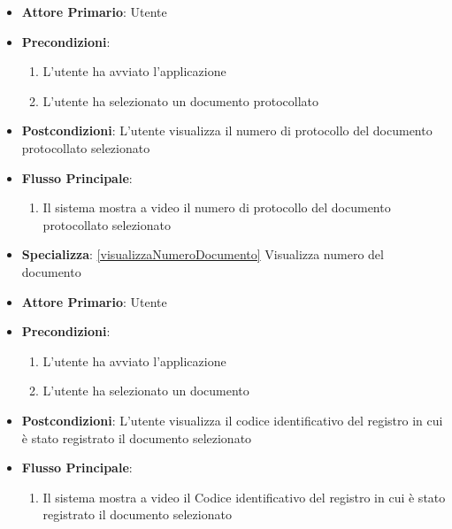 \begin{itemize}
\item \textbf{Attore Primario}: Utente
    \item \textbf{Precondizioni}:
    \begin{enumerate}
        \item L'utente ha avviato l'applicazione
        \item L'utente ha selezionato un documento protocollato
    \end{enumerate}
    \item \textbf{Postcondizioni}: L'utente visualizza il numero di protocollo del documento protocollato selezionato
    \item \textbf{Flusso Principale}:
        \begin{enumerate}
            \item Il sistema mostra a video il numero di protocollo del documento protocollato selezionato
        \end{enumerate}
    \item \textbf{Specializza}: \ref{visualizzaNumeroDocumento} Visualizza numero del documento
\end{itemize}

\begin{itemize}
    \item \textbf{Attore Primario}: Utente
    \item \textbf{Precondizioni}:
    \begin{enumerate}
        \item L'utente ha avviato l'applicazione
        \item L'utente ha selezionato un documento
    \end{enumerate}
    \item \textbf{Postcondizioni}: L'utente visualizza il codice identificativo del registro in cui è stato registrato il documento selezionato
    \item \textbf{Flusso Principale}:
        \begin{enumerate}
            \item Il sistema mostra a video il Codice identificativo del registro in cui è stato registrato il documento selezionato
        \end{enumerate}
\end{itemize}

